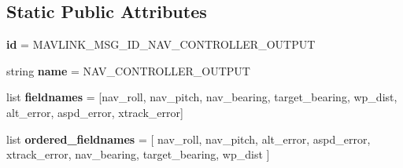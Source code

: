 \subsection*{Static Public Attributes}
\begin{DoxyCompactItemize}
\item 
\mbox{\label{classpymavlink_1_1dialects_1_1v10_1_1MAVLink__nav__controller__output__message_ac2c21a06f29f7ac7f888ce00465f5330}} 
{\bfseries id} = M\+A\+V\+L\+I\+N\+K\+\_\+\+M\+S\+G\+\_\+\+I\+D\+\_\+\+N\+A\+V\+\_\+\+C\+O\+N\+T\+R\+O\+L\+L\+E\+R\+\_\+\+O\+U\+T\+P\+UT
\item 
\mbox{\label{classpymavlink_1_1dialects_1_1v10_1_1MAVLink__nav__controller__output__message_ab952e3cfa69c542f82ee14144df67969}} 
string {\bfseries name} = \textquotesingle{}N\+A\+V\+\_\+\+C\+O\+N\+T\+R\+O\+L\+L\+E\+R\+\_\+\+O\+U\+T\+P\+UT\textquotesingle{}
\item 
\mbox{\label{classpymavlink_1_1dialects_1_1v10_1_1MAVLink__nav__controller__output__message_a43e0506e160eadf462a86bfda2f0cac5}} 
list {\bfseries fieldnames} = \mbox{[}\textquotesingle{}nav\+\_\+roll\textquotesingle{}, \textquotesingle{}nav\+\_\+pitch\textquotesingle{}, \textquotesingle{}nav\+\_\+bearing\textquotesingle{}, \textquotesingle{}target\+\_\+bearing\textquotesingle{}, \textquotesingle{}wp\+\_\+dist\textquotesingle{}, \textquotesingle{}alt\+\_\+error\textquotesingle{}, \textquotesingle{}aspd\+\_\+error\textquotesingle{}, \textquotesingle{}xtrack\+\_\+error\textquotesingle{}\mbox{]}
\item 
\mbox{\label{classpymavlink_1_1dialects_1_1v10_1_1MAVLink__nav__controller__output__message_ac6ff2e5a1133e28961d0ae0c3b24e4cb}} 
list {\bfseries ordered\+\_\+fieldnames} = \mbox{[} \textquotesingle{}nav\+\_\+roll\textquotesingle{}, \textquotesingle{}nav\+\_\+pitch\textquotesingle{}, \textquotesingle{}alt\+\_\+error\textquotesingle{}, \textquotesingle{}aspd\+\_\+error\textquotesingle{}, \textquotesingle{}xtrack\+\_\+error\textquotesingle{}, \textquotesingle{}nav\+\_\+bearing\textquotesingle{}, \textquotesingle{}target\+\_\+bearing\textquotesingle{}, \textquotesingle{}wp\+\_\+dist\textquotesingle{} \mbox{]}

\end{DoxyCompactItemize}
